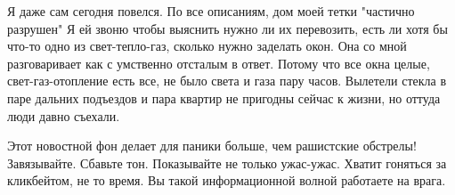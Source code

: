 Я даже сам сегодня повелся. По все описаниям, дом моей тетки "частично
разрушен" Я ей звоню чтобы выяснить нужно ли их перевозить, есть ли хотя бы
что-то одно из свет-тепло-газ, сколько нужно заделать окон. Она со мной
разговаривает как с умственно отсталым в ответ. Потому что все окна целые,
свет-газ-отопление есть все, не было света и газа пару часов. Вылетели стекла в
паре дальних подъездов и пара квартир не пригодны сейчас к жизни, но оттуда
люди давно съехали. 

Этот новостной фон делает для паники больше, чем рашистские обстрелы!
Завязывайте. Сбавьте тон. Показывайте не только ужас-ужас. Хватит гоняться за
кликбейтом, не то время. Вы такой информационной волной работаете на врага.

